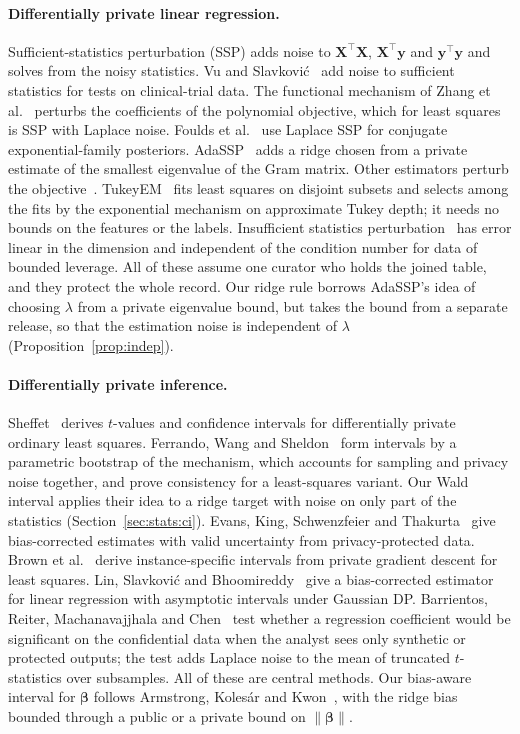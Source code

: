 \documentclass[11pt]{article}
\theoremstyle{definition}
\theoremstyle{plain}
\newcommand{\bX}{\mathbf{X}}
\newcommand{\by}{\mathbf{y}}
\newcommand{\bbeta}{\boldsymbol{\beta}}
\begin{document}
\paragraph{Differentially private linear regression.} Sufficient-statistics perturbation (SSP) adds noise to $\bX^\top\bX$, $\bX^\top\by$ and $\by^\top\by$ and solves from the noisy statistics. Vu and Slavkovi\'c~\cite{vu2009differential} add noise to sufficient statistics for tests on clinical-trial data. The functional mechanism of Zhang et al.~\cite{zhang2012functional} perturbs the coefficients of the polynomial objective, which for least squares is SSP with Laplace noise. Foulds et al.~\cite{foulds2016theory} use Laplace SSP for conjugate exponential-family posteriors. AdaSSP~\cite{wang2018revisiting} adds a ridge chosen from a private estimate of the smallest eigenvalue of the Gram matrix. Other estimators perturb the objective~\cite{chaudhuri2011differentially,kifer2012private}. TukeyEM~\cite{amin2023easy} fits least squares on disjoint subsets and selects among the fits by the exponential mechanism on approximate Tukey depth; it needs no bounds on the features or the labels. Insufficient statistics perturbation~\cite{brown2024insufficient} has error linear in the dimension and independent of the condition number for data of bounded leverage. All of these assume one curator who holds the joined table, and they protect the whole record. Our ridge rule borrows AdaSSP's idea of choosing $\lambda$ from a private eigenvalue bound, but takes the bound from a separate release, so that the estimation noise is independent of $\lambda$ (Proposition~\ref{prop:indep}).

\paragraph{Differentially private inference.} Sheffet~\cite{sheffet2017differentially} derives $t$-values and confidence intervals for differentially private ordinary least squares. Ferrando, Wang and Sheldon~\cite{ferrando2022parametric} form intervals by a parametric bootstrap of the mechanism, which accounts for sampling and privacy noise together, and prove consistency for a least-squares variant. Our Wald interval applies their idea to a ridge target with noise on only part of the statistics (Section~\ref{sec:stats:ci}). Evans, King, Schwenzfeier and Thakurta~\cite{evans2023statistically} give bias-corrected estimates with valid uncertainty from privacy-protected data. Brown et al.~\cite{brown2024private} derive instance-specific intervals from private gradient descent for least squares. Lin, Slavkovi\'c and Bhoomireddy~\cite{lin2026differentially} give a bias-corrected estimator for linear regression with asymptotic intervals under Gaussian DP. Barrientos, Reiter, Machanavajjhala and Chen~\cite{barrientos2019differentially} test whether a regression coefficient would be significant on the confidential data when the analyst sees only synthetic or protected outputs; the test adds Laplace noise to the mean of truncated $t$-statistics over subsamples. All of these are central methods. Our bias-aware interval for $\bbeta$ follows Armstrong, Koles\'ar and Kwon~\cite{armstrong2020bias}, with the ridge bias bounded through a public or a private bound on $\|\bbeta\|$.
\end{document}

